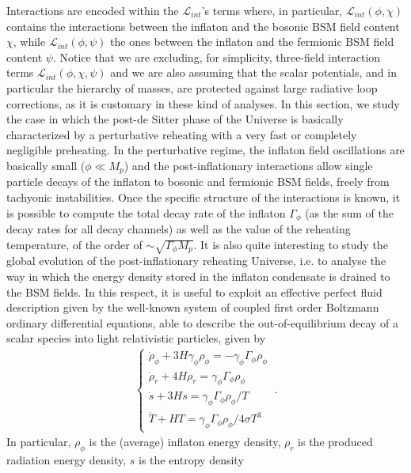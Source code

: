 \documentclass[%
aps,prd,nofootinbib,showkeys,a4paper,10pt
]{revtex4-2}
\begin{document}
Interactions are encoded within the $\mathcal{L}_{int}$'s terms where, in particular,  
$\mathcal{L}_{int}(\phi,\chi)$ contains the interactions between the inflaton and the bosonic BSM field content $\chi$, while
$\mathcal{L}_{int}(\phi,\psi)$ the ones between the inflaton
and the fermionic BSM field content $\psi$.
Notice that we are excluding, for simplicity, three-field interaction terms $\mathcal{L}_{int}(\phi,\chi,\psi)$ and we are  
also assuming that the scalar potentials, and in particular the hierarchy of masses, are protected against large radiative loop corrections, 
as it is customary in these kind of analyses.
In this section, we study the case in which the post-de Sitter phase of the Universe is basically characterized by a perturbative reheating 
with a very fast or completely negligible  preheating.
In the perturbative regime, the inflaton field oscillations are basically small ($\phi\ll M_p$) 
and the post-inflationary interactions allow single particle decays of the inflaton to bosonic and fermionic BSM fields, freely from tachyonic instabilities.
Once the specific structure of the interactions is known, it is possible to compute the total decay rate of the inflaton $\Gamma_{\phi}$
(as the sum of the decay rates for all decay channels) as well as the value of the reheating temperature, of the order of $\sim \sqrt{\Gamma_{\phi} M_p}$.
It is also quite interesting to study the global evolution of the post-inflationary reheating Universe, i.e. 
to analyse the way in which the energy density stored in the inflaton condensate is drained to the BSM fields.
In this respect, it is useful to exploit an effective perfect fluid description given by
the well-known system of coupled first order Boltzmann ordinary differential equations,  
able to describe the out-of-equilibrium decay of a scalar species into light relativistic particles, given by
\begin{eqnarray}\label{eqn: general system}
\begin{cases}
\dot{\rho}_{\phi} + 3H\gamma_{\phi}\rho_{\phi}=-\gamma_{\phi}\Gamma_{\phi}\rho_{\phi} \\
\dot{\rho}_{r} + 4H\rho_{r}=\gamma_{\phi}\Gamma_{\phi}\rho_{\phi}  \\ 
\dot{s}+3Hs=\gamma_{\phi}\Gamma_{\phi}\rho_{\phi}/T \\
\dot{T}+HT = \gamma_{\phi}\Gamma_{\phi}\rho_{\phi}/4\sigma T^3
\end{cases} \ .
\end{eqnarray}
In particular, $\rho_{\phi}$ is the (average) inflaton energy density, $\rho_{r}$ is the produced radiation energy density, $s$ is the entropy density
\end{document}
